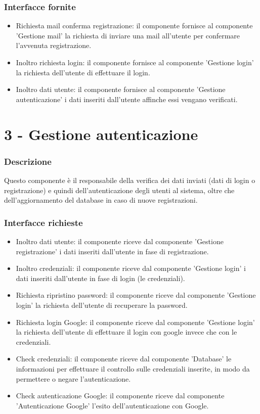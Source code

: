 \documentclass[a4paper,12pt]{article}
\begin{document}
\subsubsection*{Interfacce fornite}
\begin{itemize} \setlength\itemsep{0.01em}
\item {\sffamily Richiesta mail conferma registrazione}: il componente fornisce al componente 'Gestione mail' la richiesta di inviare una mail all'utente per confermare l'avvenuta registrazione.
\item {\sffamily Inoltro richiesta login}: il componente fornisce al componente 'Gestione login' la richiesta dell'utente di effettuare il login.
\item {\sffamily Inoltro dati utente}: il componente fornisce al componente 'Gestione autenticazione' i dati inseriti dall'utente affinche essi vengano verificati.
\end{itemize}



\section*{3 - Gestione autenticazione}
\subsubsection*{Descrizione}
Questo componente è il responsabile della verifica dei dati inviati (dati di login o registrazione) e quindi dell’autenticazione degli utenti al sistema, oltre che dell'aggiornamento del database in caso di nuove registrazioni.
\subsubsection*{Interfacce richieste}
\begin{itemize} \setlength\itemsep{0.01em}
\item {\sffamily Inoltro dati utente}: il componente riceve dal componente 'Gestione registrazione' i dati inseriti dall'utente in fase di registrazione.
\item {\sffamily Inoltro credenziali}: il componente riceve dal componente 'Gestione login' i dati inseriti dall'utente in fase di login (le credenziali).
\item {\sffamily Richiesta ripristino password}: il componente riceve dal componente 'Gestione login' la richiesta dell'utente di recuperare la password.
\item {\sffamily Richiesta login Google}: il componente riceve dal componente 'Gestione login' la richiesta dell'utente di effettuare il login con google invece che con le credenziali.
\item {\sffamily Check credenziali}: il componente riceve dal componente 'Database' le informazioni per effettuare il controllo sulle credenziali inserite, in modo da permettere o negare l'autenticazione.
\item {\sffamily Check autenticazione Google}: il componente riceve dal componente 'Autenticazione Google' l'esito dell'autenticazione con Google.
\end{itemize}
\end{document}
